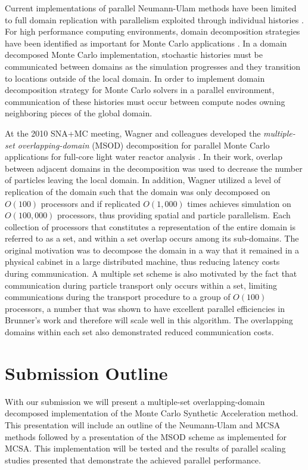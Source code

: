 \documentclass{snamc2013}
\begin{document}
Current implementations of parallel Neumann-Ulam methods have been
limited to full domain replication with parallelism exploited through
individual histories \cite{alexandrov_efficient_1998}. For high
performance computing environments, domain decomposition strategies
have been identified as important for Monte Carlo applications
\cite{brunner_comparison_2006,siegel_analysis_2012}. In a domain
decomposed Monte Carlo implementation, stochastic histories must be
communicated between domains as the simulation progresses and they
transition to locations outside of the local domain. In order to
implement domain decomposition strategy for Monte Carlo solvers in a
parallel environment, communication of these histories must occur
between compute nodes owning neighboring pieces of the global domain.

At the 2010 SNA+MC meeting, Wagner and colleagues developed the
\textit{multiple-set overlapping-domain} (MSOD) decomposition for
parallel Monte Carlo applications for full-core light water reactor
analysis \cite{wagner_hybrid_2010}. In their work, overlap between
adjacent domains in the decomposition was used to decrease the number
of particles leaving the local domain. In addition, Wagner utilized a
level of replication of the domain such that the domain was only
decomposed on $O(100)$ processors and if replicated $O(1,000)$ times
achieves simulation on $O(100,000)$ processors, thus providing spatial
and particle parallelism. Each collection of processors that
constitutes a representation of the entire domain is referred to as a
set, and within a set overlap occurs among its sub-domains. The
original motivation was to decompose the domain in a way that it
remained in a physical cabinet in a large distributed machine, thus
reducing latency costs during communication. A multiple set scheme is
also motivated by the fact that communication during particle
transport only occurs within a set, limiting communications during the
transport procedure to a group of $O(100)$ processors, a number that
was shown to have excellent parallel efficiencies in Brunner's work
\cite{brunner_efficient_2009} and therefore will scale well in this
algorithm. The overlapping domains within each set also demonstrated
reduced communication costs.

\section{Submission Outline}

With our submission we will present a multiple-set overlapping-domain
decomposed implementation of the Monte Carlo Synthetic Acceleration
method. This presentation will include an outline of the Neumann-Ulam
and MCSA methods followed by a presentation of the MSOD scheme as
implemented for MCSA. This implementation will be tested and the
results of parallel scaling studies presented that demonstrate the
achieved parallel performance.



\end{document}
